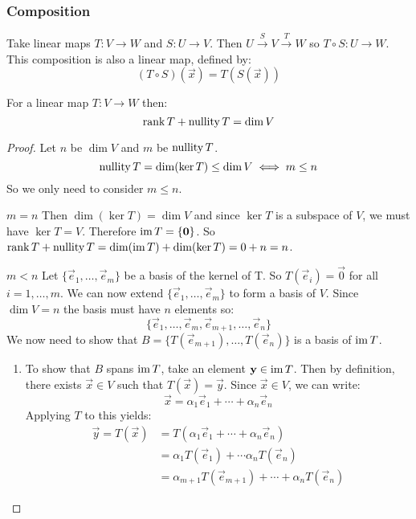 \documentclass[../main.tex]{subfiles}
\begin{document}
\subsubsection{Composition}
Take linear maps $T: V \to W$ and $S: U \to V$.
Then $U \xrightarrow{S} V \xrightarrow{T} W$ so $T \circ S: U \to W$.
This composition is also a linear map, defined by:
\[
  (T \circ S)(\vec{x}) = T(S(\vec{x}))
\]
\begin{theorem}
  For a linear map $T: V \to W$ then:
  \[
    \label{rankNullity}
    \operatorname{rank} T + \operatorname{nullity} T = \dim V
  \]
\end{theorem}
\begin{proof}
\nonexaminable
Let $n$ be $\dim V$ and $m$ be $\operatorname{nullity} T$.
\[
  \operatorname{nullity} T = \dim (\ker T) \leq \dim V \iff m \leq n
\]
So we only need to consider $m \leq n$.
\begin{proofcases}
  \begin{case}{$m = n$}
    Then $\dim(\ker T) = \dim V$ and since $\ker T$ is a subspace of $V$, we must have $\ker T = V$.
    Therefore $\operatorname{im} T = \{\boldsymbol{\mathbf{0}}\}$.
    So $\operatorname{rank} T + \operatorname{nullity} T = \dim(\operatorname{im} T) + \dim(\ker T) =0 + n = n$.
  \end{case}
  \begin{case}{$m < n$}
    Let $\{\vec{e}_1, \ldots, \vec{e}_m\}$ be a basis of the kernel of T.
    So $T(\vec{e}_i) = \vec{0}$ for all $i = 1, \ldots, m$.
    We can now extend $\{\vec{e}_1, \ldots, \vec{e}_m\}$ to form a basis of $V$.
    Since $\dim V = n$ the basis must have $n$ elements so:
    \[
      \{\vec{e}_1, \ldots, \vec{e}_m, \vec{e}_{m+1}, \ldots, \vec{e}_n\}
    \]
    We now need to show that $B = \{T(\vec{e}_{m + 1}), \ldots, T(\vec{e}_n)\}$ is a basis of $\operatorname{im} T$.
    \begin{enumerate}
      \item
      To show that $B$ spans $\operatorname{im} T$, take an element $\boldsymbol{\mathbf{y}} \in \operatorname{im} T$.
      Then by definition, there exists $\vec{x} \in V$ such that $T(\vec{x}) = \vec{y}$.
      Since $\vec{x} \in V$, we can write:
      \[
        \vec{x} = \alpha_1 \vec{e}_1 + \cdots + \alpha_n \vec{e}_n
      \]
      Applying $T$ to this yields:
      \begin{align*}
        \vec{y} = T(\vec{x}) &= T(\alpha_1 \vec{e}_1 + \cdots + \alpha_n \vec{e}_n) \\
                             &= \alpha_1 T(\vec{e}_1) + \cdots \alpha_n T(\vec{e}_n) \\
                             &= \alpha_{m + 1} T(\vec{e}_{m + 1}) + \cdots + \alpha_n T(\vec{e}_n)

\end{align*}
\end{enumerate}
\end{case}
\end{proofcases}
\end{proof}
\end{document}
